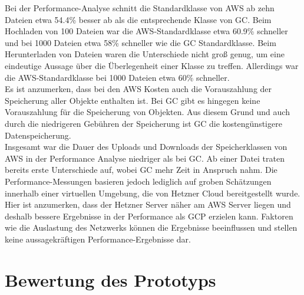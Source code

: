 Bei der Performance-Analyse schnitt die Standardklasse von AWS ab zehn Dateien etwa 54.4\% besser ab als die entsprechende Klasse von GC. Beim Hochladen von 100 Dateien war die AWS-Standardklasse etwa 60.9\% schneller und bei 1000 Dateien etwa 58\% schneller wie die GC Standardklasse. Beim Herunterladen von Dateien waren die Unterschiede nicht groß genug, um eine eindeutige Aussage über die Überlegenheit einer Klasse zu treffen. Allerdings war die AWS-Standardklasse bei 1000 Dateien etwa 60\% schneller.\\

Es ist anzumerken, dass bei den AWS Kosten auch die Vorauszahlung der Speicherung aller Objekte enthalten ist. Bei GC gibt es hingegen keine Vorauszahlung für die Speicherung von Objekten. Aus diesem Grund und auch durch die niedrigeren Gebühren der Speicherung ist GC die kostengünstigere Datenspeicherung.\\

Insgesamt war die Dauer des Uploads und Downloads der Speicherklassen von AWS in der Performance Analyse niedriger als bei GC. Ab einer Datei traten bereits erste Unterschiede auf, wobei GC mehr Zeit in Anspruch nahm. Die Performance-Messungen basieren jedoch lediglich auf groben Schätzungen innerhalb einer virtuellen Umgebung, die von Hetzner Cloud bereitgestellt wurde. Hier ist anzumerken, dass der Hetzner Server näher am AWS Server liegen und deshalb bessere Ergebnisse in der Performance als GCP erzielen kann. Faktoren wie die Auslastung des Netzwerks können die Ergebnisse beeinflussen und stellen keine aussagekräftigen Performance-Ergebnisse dar.\\

\section{Bewertung des Prototyps}

